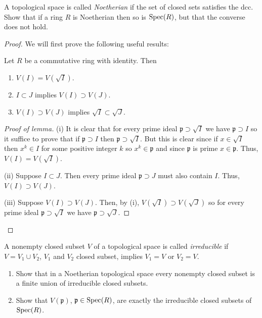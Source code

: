 \newpage
\begin{problem}
A topological space is called \emph{Noetherian} if the set of
closed sets satisfies the dcc. Show that if a ring $R$ is
Noetherian then so is $\operatorname{Spec}(R)$, but that the converse does not
hold.
\end{problem}
\begin{proof}
We will first prove the following useful results:
\begin{lemma*}
Let $R$ be a commutative ring with identity. Then
\begin{enumerate}[noitemsep,label=(\roman*)]
\item $V(I)=V(\sqrt{I})$.
\item $I\subset J$ implies $V(I)\supset V(J)$.
\item $V(I)\supset V(J)$ implies $\sqrt{I}\subset\sqrt{J}$.
\end{enumerate}
\end{lemma*}
\begin{proof}[Proof of lemma]
\renewcommand\qedsymbol{$\clubsuit$}
(i) It is clear that for every prime ideal
$\mathfrak{p}\supset\sqrt{I}$ we have $\mathfrak{p}\supset I$ so
it suffice to prove that if $\mathfrak{p}\supset I$ then
$\mathfrak{p}\supset\sqrt{I}$. But this is clear since if
$x\in\sqrt{I}$ then $x^k\in I$ for some positive integer $k$ so
$x^k\in\mathfrak{p}$ and since $\mathfrak{p}$ is prime
$x\in\mathfrak{p}$. Thus, $V(I)=V(\sqrt{I})$.

(ii) Suppose $I\subset J$. Then every prime ideal
$\mathfrak{p}\supset J$ must also contain $I$. Thus, $V(I)\supset
V(J)$.

(iii) Suppose $V(I)\supset V(J)$. Then, by (i),
$V(\sqrt{I})\supset V(\sqrt{J})$ so for every prime ideal
$\mathfrak{p}\supset\sqrt{I}$ we have
$\mathfrak{p}\supset\sqrt{J}$.
\end{proof}
\end{proof}
\newpage
\begin{problem}
A nonempty closed subset $V$ of a topological space is called
\emph{irreducible} if $V=V_1\cup V_2$, $V_1$ and $V_2$ closed
subset, implies $V_1=V$ or $V_2=V$.
\begin{enumerate}[noitemsep,label=(\alph*)]
\item Show that in a Noetherian topological space every nonempty
  closed subset is a finite union of irreducible closed subsets.
\item Show that $V(\mathfrak{p})$, $\mathfrak{p}\in\operatorname{Spec}(R)$, are
  exactly the irreducible closed subsets of $\operatorname{Spec}(R)$.
\end{enumerate}
\end{problem}
